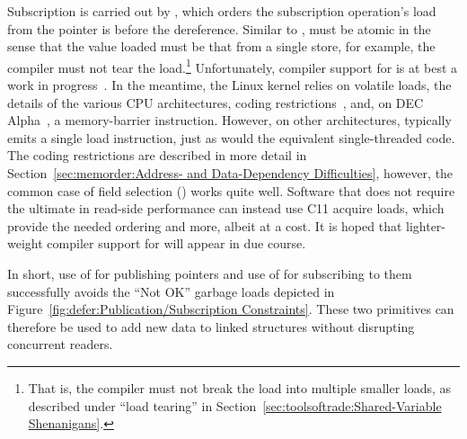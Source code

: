 Subscription is carried out by , which orders
the subscription operation's load from the pointer is before the
dereference.
Similar to ,  must be
atomic in the sense that the value loaded must be that from a single
store, for example, the compiler must not tear the load.\footnote{
	That is, the compiler must not break the load into multiple
	smaller loads, as described under ``load tearing'' in
	Section~\ref{sec:toolsoftrade:Shared-Variable Shenanigans}.}
Unfortunately, compiler support for  is at best
a work in progress~\cite{PaulEMcKennneyConsumeP0190R4,PaulEMcKenney2017markconsumeP0462R1,JFBastien2018P0750R1consume}.
In the meantime, the Linux kernel relies on volatile loads, the details of
the various CPU architectures, coding
restrictions~\cite{PaulEMcKenney2014rcu-dereference},
and, on DEC Alpha~\cite{ALPHA2002}, a memory-barrier instruction.
However, on other architectures,  typically
emits a single load instruction, just as would the equivalent single-threaded
code.
The coding restrictions are described in more detail in
Section~\ref{sec:memorder:Address- and Data-Dependency Difficulties},
however, the common case of field selection (\qtco{->}) works quite well.
Software that does not require the ultimate in read-side performance
can instead use C11 acquire loads, which provide the needed ordering and
more, albeit at a cost.
It is hoped that lighter-weight compiler support for 
will appear in due course.

In short, use of  for publishing pointers and
use of  for subscribing to them successfully avoids the
``Not OK'' garbage loads depicted in
Figure~\ref{fig:defer:Publication/Subscription Constraints}.
These two primitives can therefore be used to add new data to linked
structures without disrupting concurrent readers.

